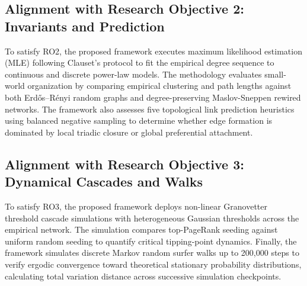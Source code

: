 \documentclass[conference]{IEEEtran}
\begin{document}
\subsection{Alignment with Research Objective 2: Invariants and Prediction}
To satisfy RO2, the proposed framework executes maximum likelihood estimation (MLE) following Clauset's protocol to fit the empirical degree sequence to continuous and discrete power-law models. The methodology evaluates small-world organization by comparing empirical clustering and path lengths against both Erd\H{o}s--R\'enyi random graphs and degree-preserving Maslov-Sneppen rewired networks. The framework also assesses five topological link prediction heuristics using balanced negative sampling to determine whether edge formation is dominated by local triadic closure or global preferential attachment.

\subsection{Alignment with Research Objective 3: Dynamical Cascades and Walks}
To satisfy RO3, the proposed framework deploys non-linear Granovetter threshold cascade simulations with heterogeneous Gaussian thresholds across the empirical network. The simulation compares top-PageRank seeding against uniform random seeding to quantify critical tipping-point dynamics. Finally, the framework simulates discrete Markov random surfer walks up to 200,000 steps to verify ergodic convergence toward theoretical stationary probability distributions, calculating total variation distance across successive simulation checkpoints.
\end{document}
